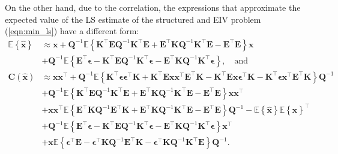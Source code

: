 On the other hand, due to the correlation, the expressions that approximate the expected value of the LS estimate of the structured and EIV problem (\ref{eqn:min_ls}) have a different form:
\begin{equation} \begin{aligned} \mathbb{E} \left\{ \widehat{\mathbf{x}} \right\} & \approx \mathbf{x}  +  \mathbf{Q}^{-1} \mathbb{E} \left\{ \mathbf{K}^\top \mathbf{E} \mathbf{Q}^{-1} \mathbf{K}^\top \mathbf{E} + \mathbf{E}^\top \mathbf{K} \mathbf{Q}^{-1} \mathbf{K}^\top \mathbf{E} - \mathbf{E}^\top \mathbf{E}  \right\} \mathbf{x} \\ 
& + \mathbf{Q}^{-1} \mathbb{E} \left\{ \mathbf{E}^\top \bm{\epsilon} - \mathbf{K}^\top \mathbf{E} \mathbf{Q}^{-1} \mathbf{K}^\top \bm{\epsilon} - \mathbf{E}^\top \mathbf{K} \mathbf{Q}^{-1} \mathbf{K}^\top \bm{\epsilon} \right\} , \quad \text{and}  \\ 
\mathbf{C} \left( \widehat{\mathbf{x}} \right)  & \approx \mathbf{x} \mathbf{x}^\top + \mathbf{Q}^{-1} \mathbb{E} \left\{ \mathbf{K}^\top \bm{\epsilon} \bm{\epsilon}^\top \mathbf{K} + \mathbf{K}^\top \mathbf{E} \mathbf{x} \mathbf{x}^\top \mathbf{E}^\top \mathbf{K} - \mathbf{K}^\top \mathbf{E} \mathbf{x} \bm{\epsilon}^\top \mathbf{K} - \mathbf{K}^\top \bm{\epsilon} \mathbf{x}^\top \mathbf{E}^\top \mathbf{K} \right\} \mathbf{Q}^{-1}  \\
& + \mathbf{Q}^{-1} \mathbb{E} \left\{ \mathbf{K}^\top \mathbf{E} \mathbf{Q}^{-1} \mathbf{K}^\top \mathbf{E} + \mathbf{E}^\top \mathbf{K} \mathbf{Q}^{-1} \mathbf{K}^\top \mathbf{E} - \mathbf{E}^\top \mathbf{E} \right\} \mathbf{x} \mathbf{x}^\top \\
& + \mathbf{x} \mathbf{x}^\top \mathbb{E} \left\{ \mathbf{E}^\top \mathbf{K} \mathbf{Q}^{-1} \mathbf{E}^\top \mathbf{K} + \mathbf{E}^\top \mathbf{K} \mathbf{Q}^{-1} \mathbf{K}^\top \mathbf{E} - \mathbf{E}^\top \mathbf{E} \right\} \mathbf{Q}^{-1} - \mathbb{E} \left\{ \widehat{\mathbf{x}} \right\} \mathbb{E} \left\{ \widehat{\mathbf{x}} \right\}^\top \\ 
& + \mathbf{Q}^{-1} \mathbb{E} \left\{ \mathbf{E}^\top \bm{\epsilon} - \mathbf{K}^\top \mathbf{E} \mathbf{Q}^{-1} \mathbf{K}^\top \bm{\epsilon} - \mathbf{E}^\top \mathbf{K} \mathbf{Q}^{-1} \mathbf{K}^\top \bm{\epsilon} \right\} \mathbf{x}^\top \\
& + \mathbf{x} \mathbb{E} \left\{ \bm{\epsilon}^\top \mathbf{E} - \bm{\epsilon}^\top \mathbf{K} \mathbf{Q}^{-1} \mathbf{E}^\top \mathbf{K} - \bm{\epsilon}^\top \mathbf{K} \mathbf{Q}^{-1} \mathbf{K}^\top \mathbf{E} \right\} \mathbf{Q}^{-1}. \label{eqn:EC_E} \end{aligned} \end{equation} 
